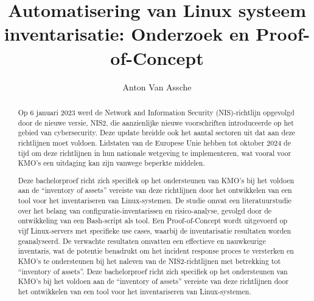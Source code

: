 \documentclass{hogent-article}
\title{Automatisering van Linux systeem inventarisatie: Onderzoek en Proof-of-Concept}
\author{Anton Van Assche}
\begin{document}
\begin{abstract}
    Op 6 januari 2023 werd de Network and Information Security (NIS)-richtlijn opgevolgd door de nieuwe versie, NIS2, die aanzienlijke nieuwe voorschriften introduceerde op het gebied van cybersecurity.
    Deze update breidde ook het aantal sectoren uit dat aan deze richtlijnen moet voldoen.
    Lidstaten van de Europese Unie hebben tot oktober 2024 de tijd om deze richtlijnen in hun nationale wetgeving te implementeren, wat vooral voor KMO's een uitdaging kan zijn vanwege beperkte middelen.

    Deze bachelorproef richt zich specifiek op het ondersteunen van KMO's bij het voldoen aan de ``inventory of assets'' vereiste van deze richtlijnen door het ontwikkelen van een tool voor het inventariseren van Linux-systemen.
    De studie omvat een literatuurstudie over het belang van configuratie-inventarissen en risico-analyse, gevolgd door de ontwikkeling van een Bash-script als tool.
    Een Proof-of-Concept wordt uitgevoerd op vijf Linux-servers met specifieke use cases, waarbij de inventarisatie resultaten worden geanalyseerd.
    De verwachte resultaten omvatten een effectieve en nauwkeurige inventaris, wat de potentie benadrukt om het incident response proces te versterken en KMO's te ondersteunen bij het naleven van de NIS2-richtlijnen met betrekking tot ``inventory of assets''.
    Deze bachelorproef richt zich specifiek op het ondersteunen van KMO's bij het voldoen aan de ``inventory of assets'' vereiste van deze richtlijnen door het ontwikkelen van een tool voor het inventariseren van Linux-systemen.
\end{abstract}

\tableofcontents



\printbibliography[heading=bibintoc]
\end{document}
